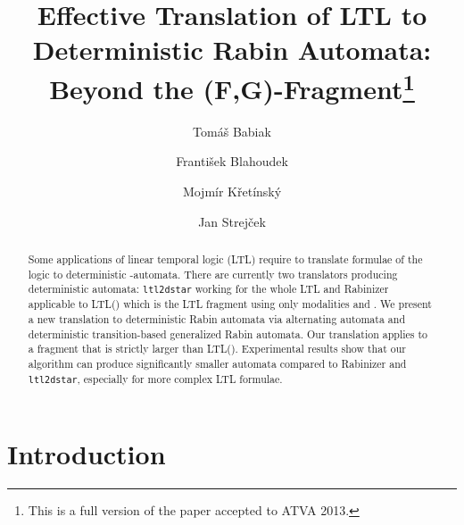 \documentclass{llncs}
\begin{document}
\frontmatter



\title{Effective Translation of LTL to Deterministic Rabin Automata: Beyond
  the (F,G)-Fragment\thanks{This is a full version of the paper accepted to
    ATVA 2013.}}
\author{Tom\'{a}\v{s} Babiak \and Franti\v{s}ek Blahoudek \and Mojm\'{i}r
  K\v{r}et\'{i}nsk\'{y} \and Jan Strej\v{c}ek}



\maketitle




\begin{abstract}
  Some applications of linear temporal logic (LTL) require to translate
  formulae of the logic to deterministic -automata. There are
  currently two translators producing deterministic automata:
  \texttt{ltl2dstar} working for the whole LTL and Rabinizer applicable to
  LTL() which is the LTL fragment using only modalities  and .  We
  present a new translation to deterministic Rabin automata via alternating
  automata and deterministic transition-based generalized Rabin
  automata. Our translation applies to a fragment that is strictly larger
  than LTL(). Experimental results show that our algorithm can produce
  significantly smaller automata compared to Rabinizer and
  \texttt{ltl2dstar}, especially for more complex LTL formulae.
\end{abstract}	



\section{Introduction}
\end{document}
